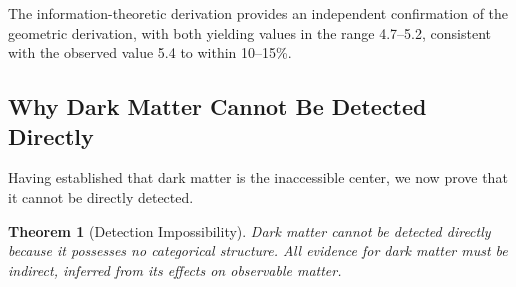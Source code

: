 \documentclass[12pt,a4paper]{article}
\newtheorem{theorem}{Theorem}[section]
\theoremstyle{definition}
\theoremstyle{remark}
\begin{document}
The information-theoretic derivation provides an independent confirmation of the geometric derivation, with both yielding values in the range 4.7–5.2, consistent with the observed value 5.4 to within 10–15\%.

\subsection{Why Dark Matter Cannot Be Detected Directly}

Having established that dark matter is the inaccessible center, we now prove that it cannot be directly detected.

\begin{theorem}[Detection Impossibility]
\label{thm:detection_impossibility}
Dark matter cannot be detected directly because it possesses no categorical structure. All evidence for dark matter must be indirect, inferred from its effects on observable matter.
\end{theorem}
\end{document}
